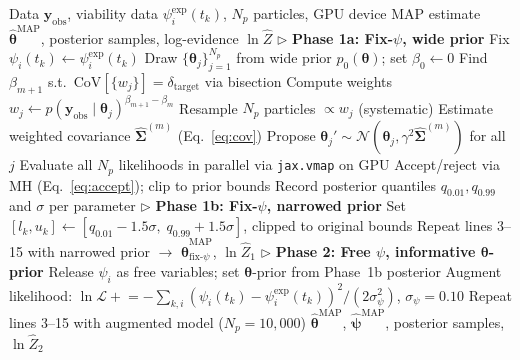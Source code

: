 \documentclass[11pt,a4paper]{article}
\newcommand{\btheta}{\boldsymbol{\theta}}
\newcommand{\bpsi}{\boldsymbol{\psi}}
\newcommand{\yobs}{\mathbf{y}_{\mathrm{obs}}}
\begin{document}
\begin{algorithm}[t]
\caption{Two-phase GPU-accelerated TMCMC}
\label{alg:tmcmc}
\begin{algorithmic}[1]
\REQUIRE Data $\yobs$, viability data $\psi_i^{\mathrm{exp}}(t_k)$, $N_p$ particles, GPU device
\ENSURE MAP estimate $\hat{\btheta}^{\mathrm{MAP}}$, posterior samples, log-evidence $\ln\hat{Z}$
\STATE $\triangleright$ \textbf{Phase 1a: Fix-$\psi$, wide prior}
\STATE Fix $\psi_i(t_k) \leftarrow \psi_i^{\mathrm{exp}}(t_k)$
\STATE Draw $\{\btheta_j\}_{j=1}^{N_p}$ from wide prior $p_0(\btheta)$; set $\beta_0\leftarrow 0$
    \STATE Find $\beta_{m+1}$ s.t.\ $\mathrm{CoV}[\{w_j\}]=\delta_{\mathrm{target}}$ via bisection
    \STATE Compute weights $w_j \leftarrow p(\yobs\mid\btheta_j)^{\beta_{m+1}-\beta_m}$
    \STATE Resample $N_p$ particles $\propto w_j$ (systematic)
    \STATE Estimate weighted covariance $\hat{\boldsymbol{\Sigma}}^{(m)}$ (Eq.~\ref{eq:cov})
        \STATE Propose $\btheta_{j}' \sim \mathcal{N}(\btheta_j, \gamma^2 \hat{\boldsymbol{\Sigma}}^{(m)})$ for all $j$
        \STATE Evaluate all $N_p$ likelihoods in parallel via \texttt{jax.vmap} on GPU
        \STATE Accept/reject via MH (Eq.~\ref{eq:accept}); clip to prior bounds
    \ENDFOR
\ENDWHILE
\STATE Record posterior quantiles $q_{0.01},q_{0.99}$ and $\sigma$ per parameter
\STATE $\triangleright$ \textbf{Phase 1b: Fix-$\psi$, narrowed prior}
\STATE Set $[l_k,u_k] \leftarrow [q_{0.01}-1.5\sigma,\;q_{0.99}+1.5\sigma]$, clipped to original bounds
\STATE Repeat lines 3--15 with narrowed prior $\to$ $\hat{\btheta}^{\mathrm{MAP}}_{\text{fix-}\psi}$, $\ln\hat{Z}_1$
\STATE $\triangleright$ \textbf{Phase 2: Free $\psi$, informative $\btheta$-prior}
\STATE Release $\psi_i$ as free variables; set $\btheta$-prior from Phase~1b posterior
\STATE Augment likelihood: $\ln\mathcal{L} \mathrel{+}= -\sum_{k,i}(\psi_i(t_k)-\psi_i^{\mathrm{exp}}(t_k))^2/(2\sigma_\psi^2)$, $\sigma_\psi=0.10$
\STATE Repeat lines 3--15 with augmented model ($N_p=10{,}000$)
\RETURN $\hat{\btheta}^{\mathrm{MAP}}$, $\hat{\bpsi}^{\mathrm{MAP}}$, posterior samples, $\ln\hat{Z}_2$
\end{algorithmic}
\end{algorithm}
\end{document}
